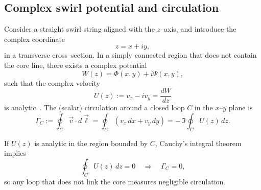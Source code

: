 \documentclass[11pt]{article}
\begin{document}
    \subsection{Complex swirl potential and circulation}
        \label{subsec:sst_complex_potential}

        Consider a straight swirl string aligned with the \(z\)--axis, and introduce the complex coordinate
        \begin{equation}
            z = x + i y,
        \end{equation}
        in a transverse cross--section. In a simply connected region that does not contain the core line, there exists a complex potential
        \begin{equation}
            W(z) = \Phi(x,y) + i \Psi(x,y),
        \end{equation}
        such that the complex velocity
        \begin{equation}
            U(z)
            :=
            v_x - i v_y
            =
            \frac{dW}{dz}
            \label{eq:sst_complex_velocity}
        \end{equation}
        is analytic~\cite{ahlforsComplexAnalysis1979}. The (scalar) circulation around a closed loop \(C\) in the \(x\)–\(y\) plane is
        \begin{equation}
            \Gamma_C
            :=
            \oint_C \vec{v}\cdot d\vec{\ell}
            =
            \oint_C (v_x\,dx + v_y\,dy)
            =
            -\,\Im \oint_C U(z)\,dz.
            \label{eq:sst_circulation_def}
        \end{equation}

        If \(U(z)\) is analytic in the region bounded by \(C\), Cauchy’s integral theorem implies
        \begin{equation}
            \oint_C U(z)\,dz = 0
            \quad\Rightarrow\quad
            \Gamma_C = 0,
        \end{equation}
        so any loop that does not link the core measures negligible circulation.
\end{document}
